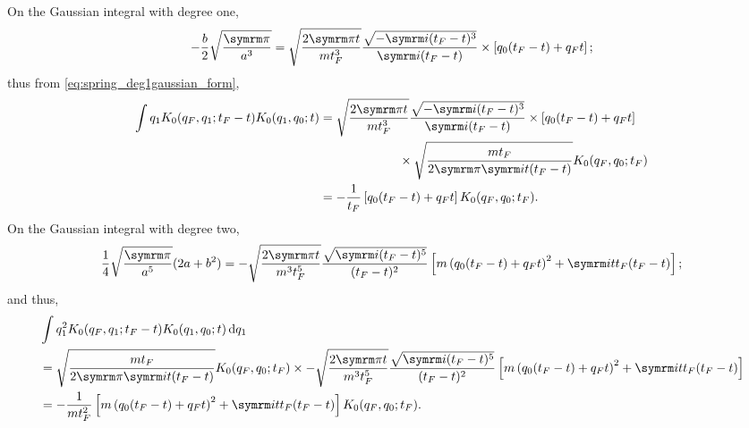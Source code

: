 On the Gaussian integral with degree one,
\begin{equation}
    -\frac{b}{2}\sqrt{\frac{\cpi}{a^3}} = \sqrt{\frac{2\cpi t}{mt_F^3}}\frac{\sqrt{-\im(t_F - t)^3}}{\im(t_F - t)} \times \left[q_0(t_F - t) + q_Ft\right];
\end{equation}
thus from \cref{eq:spring_deg1gaussian_form},
\begin{align}
    \int q_1K_0(q_F, q_1; t_F - t)K_0(q_1, q_0; t) &= \begin{multlined}[t]
        \sqrt{\frac{2\cpi t}{mt_F^3}}\frac{\sqrt{-\im(t_F - t)^3}}{\im(t_F - t)} \times \left[q_0(t_F - t) + q_Ft\right] \\
        \times \sqrt{\frac{mt_F}{2\cpi\im t(t_F - t)}}K_0(q_F, q_0; t_F)
    \end{multlined} \\
    &= -\frac{1}{t_F}\left[q_0(t_F - t) + q_Ft\right]K_0(q_F, q_0; t_F).
\end{align}
On the Gaussian integral with degree two,
\begin{equation}
    \frac{1}{4}\sqrt{\frac{\cpi}{a^5}}(2a + b^2) = -\sqrt{\frac{2\cpi t}{m^3t_F^5}}\frac{\sqrt{\im(t_F - t)^5}}{(t_F - t)^2}\left[m\left(q_0(t_F - t) + q_Ft\right)^2 + \im tt_F(t_F - t)\right];
\end{equation}
and thus,
\begin{align}
    &\int q_1^2K_0(q_F, q_1; t_F - t)K_0(q_1, q_0; t)\dd{q_1} \\
    &= \sqrt{\frac{mt_F}{2\cpi\im t(t_F - t)}}K_0(q_F, q_0; t_F)  \times -\sqrt{\frac{2\cpi t}{m^3t_F^5}}\frac{\sqrt{\im(t_F - t)^5}}{(t_F - t)^2}\left[m\left(q_0(t_F - t) + q_Ft\right)^2 + \im tt_F(t_F - t)\right] \nonumber\\
    &= -\frac{1}{mt_F^2}\left[m\left(q_0(t_F - t) + q_Ft\right)^2 + \im tt_F(t_F - t)\right]K_0(q_F, q_0; t_F).
\end{align}

